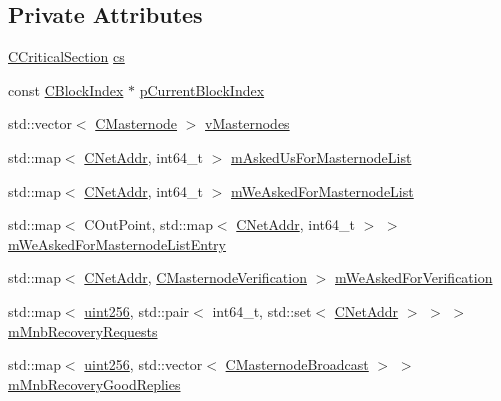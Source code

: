 \subsection*{Private Attributes}
\begin{DoxyCompactItemize}
\item 
\mbox{\hyperlink{sync_8h_a37a4692b2d517f2843655ca11af7668a}{C\+Critical\+Section}} \mbox{\hyperlink{class_c_masternode_man_aba950f06d6e446ee01277d54aab64916}{cs}}
\item 
const \mbox{\hyperlink{class_c_block_index}{C\+Block\+Index}} $\ast$ \mbox{\hyperlink{class_c_masternode_man_ac50dc874a07bacdaa8d0945e52e8e9c6}{p\+Current\+Block\+Index}}
\item 
std\+::vector$<$ \mbox{\hyperlink{class_c_masternode}{C\+Masternode}} $>$ \mbox{\hyperlink{class_c_masternode_man_a59413613b16eca496f9ae35697932b9b}{v\+Masternodes}}
\item 
std\+::map$<$ \mbox{\hyperlink{class_c_net_addr}{C\+Net\+Addr}}, int64\+\_\+t $>$ \mbox{\hyperlink{class_c_masternode_man_a082f017595596b9009c81b7ab9eed1a1}{m\+Asked\+Us\+For\+Masternode\+List}}
\item 
std\+::map$<$ \mbox{\hyperlink{class_c_net_addr}{C\+Net\+Addr}}, int64\+\_\+t $>$ \mbox{\hyperlink{class_c_masternode_man_a108400cad1547f0c8b1ff52f43ae0b85}{m\+We\+Asked\+For\+Masternode\+List}}
\item 
std\+::map$<$ C\+Out\+Point, std\+::map$<$ \mbox{\hyperlink{class_c_net_addr}{C\+Net\+Addr}}, int64\+\_\+t $>$ $>$ \mbox{\hyperlink{class_c_masternode_man_af718cdbbe2b7bc7b7a637d5a3b7cb9f4}{m\+We\+Asked\+For\+Masternode\+List\+Entry}}
\item 
std\+::map$<$ \mbox{\hyperlink{class_c_net_addr}{C\+Net\+Addr}}, \mbox{\hyperlink{class_c_masternode_verification}{C\+Masternode\+Verification}} $>$ \mbox{\hyperlink{class_c_masternode_man_a6cb19628477bc0cfca024195ca35ffa0}{m\+We\+Asked\+For\+Verification}}
\item 
std\+::map$<$ \mbox{\hyperlink{classuint256}{uint256}}, std\+::pair$<$ int64\+\_\+t, std\+::set$<$ \mbox{\hyperlink{class_c_net_addr}{C\+Net\+Addr}} $>$ $>$ $>$ \mbox{\hyperlink{class_c_masternode_man_a74e0c8ef0ce00ba6f43eff69b83bce13}{m\+Mnb\+Recovery\+Requests}}
\item 
std\+::map$<$ \mbox{\hyperlink{classuint256}{uint256}}, std\+::vector$<$ \mbox{\hyperlink{class_c_masternode_broadcast}{C\+Masternode\+Broadcast}} $>$ $>$ \mbox{\hyperlink{class_c_masternode_man_aaa4b7e50515782080b897444b1d7f439}{m\+Mnb\+Recovery\+Good\+Replies}}
\item 

\end{DoxyCompactItemize}
